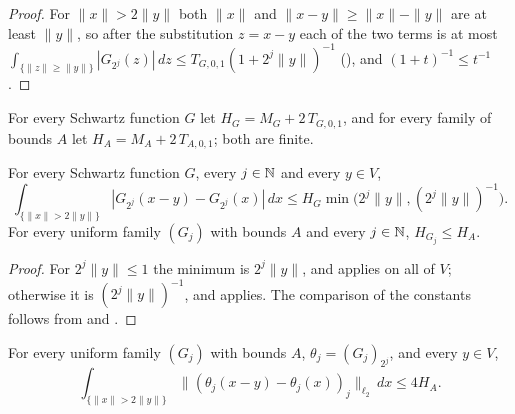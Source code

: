 \begin{proof}
\leanok
For $\|x\| > 2 \|y\|$ both $\|x\|$ and $\|x - y\| \geq \|x\| - \|y\|$ are at least $\|y\|$, so
after the substitution $z = x - y$ each of the two terms is at most
$\int_{\{\|z\| \geq \|y\|\}} |G_{2^j}(z)| \, dz \leq T_{G,0,1} (1 + 2^j \|y\|)^{-1}$
(), and $(1 + t)^{-1} \leq t^{-1}$.
\end{proof}

\begin{definition}
\label{def:hormander-const}
\leanok
{}
For every Schwartz function $G$ let $H_G = M_G + 2 \, T_{G,0,1}$, and for every family of bounds
$A$ let $H_A = M_A + 2 \, T_{A,0,1}$; both are finite.
\end{definition}

\begin{proposition}
\label{prop:hormander-one-dilate}
\leanok
{}
For every Schwartz function $G$, every $j \in \mathbb{N}$ and every $y \in V$,
\[
  \int_{\{\|x\| > 2\|y\|\}} |G_{2^j}(x - y) - G_{2^j}(x)| \, dx \leq
  H_G \min\bigl(2^j \|y\|, (2^j \|y\|)^{-1}\bigr) .
\]
For every uniform family $(G_j)$ with bounds $A$ and every $j \in \mathbb{N}$, $H_{G_j} \leq H_A$.
\end{proposition}

\begin{proof}
\leanok
For $2^j \|y\| \leq 1$ the minimum is $2^j \|y\|$, and  applies on all
of $V$; otherwise it is $(2^j \|y\|)^{-1}$, and  applies. The
comparison of the constants follows from  and
.
\end{proof}

\begin{theorem}
\label{thm:hormander-dilation-family}
\leanok
{}
For every uniform family $(G_j)$ with bounds $A$, $\theta_j = (G_j)_{2^j}$, and every
$y \in V$,
\[
  \int_{\{\|x\| > 2\|y\|\}} \|(\theta_j(x - y) - \theta_j(x))_j\|_{\ell_2} \, dx \leq 4 H_A .
\]
\end{theorem}

